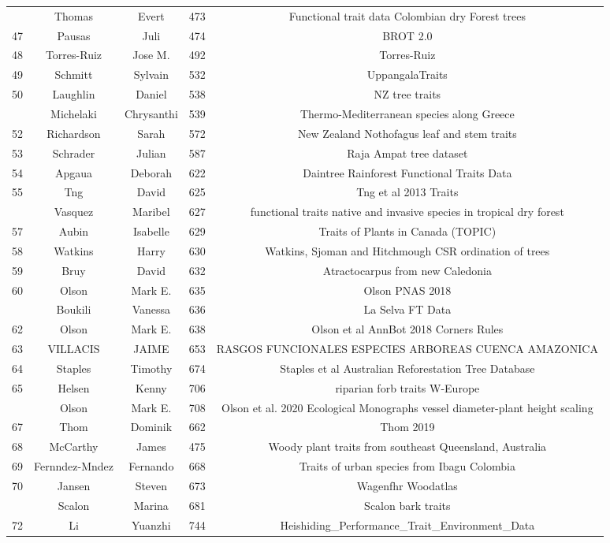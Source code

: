 \documentclass[
  12pt,
  letterpaper,
  DIV=11,
  numbers=noendperiod]{scrartcl}
\begin{document}
\begin{longtable*}[t]{ccccc}
 & Thomas & Evert & 473 & Functional trait data Colombian dry Forest trees\\
47 & Pausas & Juli & 474 & BROT 2.0\\
48 & Torres-Ruiz & Jose M. & 492 & Torres-Ruiz\\
49 & Schmitt & Sylvain & 532 & UppangalaTraits\\
50 & Laughlin & Daniel & 538 & NZ tree traits\\
 & Michelaki & Chrysanthi & 539 & Thermo-Mediterranean species along Greece\\
52 & Richardson & Sarah & 572 & New Zealand Nothofagus leaf and stem traits\\
53 & Schrader & Julian & 587 & Raja Ampat tree dataset\\
54 & Apgaua & Deborah & 622 & Daintree Rainforest Functional Traits Data\\
55 & Tng & David & 625 & Tng et al 2013 Traits\\
 & Vasquez & Maribel & 627 & functional traits native and invasive species in tropical dry forest\\
57 & Aubin & Isabelle & 629 & Traits of Plants in Canada (TOPIC)\\
58 & Watkins & Harry & 630 & Watkins, Sjoman and Hitchmough CSR ordination of trees\\
59 & Bruy & David & 632 & Atractocarpus from new Caledonia\\
60 & Olson & Mark E. & 635 & Olson PNAS 2018\\
 & Boukili & Vanessa & 636 & La Selva FT Data\\
62 & Olson & Mark E. & 638 & Olson et al AnnBot 2018 Corners Rules\\
63 & VILLACIS & JAIME & 653 & RASGOS FUNCIONALES ESPECIES ARBOREAS CUENCA AMAZONICA\\
64 & Staples & Timothy & 674 & Staples et al Australian Reforestation Tree Database\\
65 & Helsen & Kenny & 706 & riparian forb traits W-Europe\\
 & Olson & Mark E. & 708 & Olson et al. 2020 Ecological Monographs vessel diameter-plant height scaling\\
67 & Thom & Dominik & 662 & Thom 2019\\
68 & McCarthy & James & 475 & Woody plant traits from southeast Queensland, Australia\\
69 & Fernndez-Mndez & Fernando & 668 & Traits of urban species from Ibagu Colombia\\
70 & Jansen & Steven & 673 & Wagenfhr Woodatlas\\
 & Scalon & Marina & 681 & Scalon bark traits\\
72 & Li & Yuanzhi & 744 & Heishiding\_Performance\_Trait\_Environment\_Data\\
\bottomrule
\end{longtable*}
\endgroup{}
\end{document}
